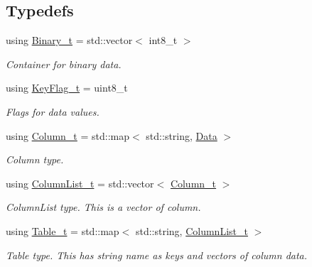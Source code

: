 \subsection*{Typedefs}
\begin{DoxyCompactItemize}
\item 
\mbox{\label{namespacesf_a3cfcc379b8afaf098c4e1aa67ef92186}} 
using \hyperlink{namespacesf_a3cfcc379b8afaf098c4e1aa67ef92186}{Binary\+\_\+t} = std\+::vector$<$ int8\+\_\+t $>$
\begin{DoxyCompactList}\small\item\em Container for binary data. \end{DoxyCompactList}\item 
\mbox{\label{namespacesf_ab38d6ab0cbacec81e7d09c0d53feb958}} 
using \hyperlink{namespacesf_ab38d6ab0cbacec81e7d09c0d53feb958}{Key\+Flag\+\_\+t} = uint8\+\_\+t
\begin{DoxyCompactList}\small\item\em Flags for data values. \end{DoxyCompactList}\item 
using \hyperlink{namespacesf_a390d6a976138adf32ace872bbd298a30}{Column\+\_\+t} = std\+::map$<$ std\+::string, \hyperlink{classsf_1_1Data}{Data} $>$
\begin{DoxyCompactList}\small\item\em Column type. \end{DoxyCompactList}\item 
\mbox{\label{namespacesf_a1307fc2d55d71a89cf1ac82655a9b1eb}} 
using \hyperlink{namespacesf_a1307fc2d55d71a89cf1ac82655a9b1eb}{Column\+List\+\_\+t} = std\+::vector$<$ \hyperlink{namespacesf_a390d6a976138adf32ace872bbd298a30}{Column\+\_\+t} $>$
\begin{DoxyCompactList}\small\item\em Column\+List type. This is a vector of column. \end{DoxyCompactList}\item 
using \hyperlink{namespacesf_a11fc7064fe56167aaff3e5fea85ac7a2}{Table\+\_\+t} = std\+::map$<$ std\+::string, \hyperlink{namespacesf_a1307fc2d55d71a89cf1ac82655a9b1eb}{Column\+List\+\_\+t} $>$
\begin{DoxyCompactList}\small\item\em Table type. This has string name as keys and vectors of column data. \end{DoxyCompactList}\item 

\end{DoxyCompactItemize}
